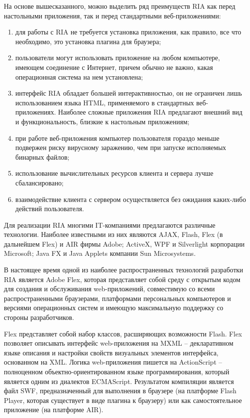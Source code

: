 На основе вышесказанного, можно выделить ряд преимуществ RIA как перед настольными приложения,
так и перед стандартными веб-приложениями:

\begin{enumerate}
\item для работы с RIA не требуется установка приложения, как правило, все что необходимо, это установка плагина
для браузера;
\item пользователи могут использовать приложение на любом компьютере, имеющем соединение с Интернет,
причем обычно не важно, какая операционная система на нем установлена;
\item интерфейс RIA обладает большей интерактивностью, он не ограничен лишь использованием языка
HTML, применяемого в стандартных веб-приложениях. Наиболее сложные приложения RIA предлагают 
внешний вид и функциональность, близкие к настольным приложениям;
\item при работе веб-приложения компьютер пользователя гораздо меньше подвержен риску
вирусному заражению, чем при запуске исполняемых бинарных файлов;
\item использование вычислительных ресурсов клиента и сервера лучше сбалансировано;
\item взаимодействие клиента с сервером осуществляется без ожидания каких-либо действий
пользователя.
\end{enumerate}

Для реализации RIA многими IT-компаниями предлагаются различные технологии. Наиболее известными из 
них являются AJAX, Flash, Flex (в дальнейшем Flex) и AIR фирмы Adobe; ActiveX, WPF и Silverlight
корпорации Microsoft; Java FX и Java Applets компании Sun Microsystems.

В настоящее время одной из наиболее распространенных технологий разработки RIA является Adobe Flex,
которая представляет собой среду с открытым кодом для создания и обслуживания web-приложений,
совместимую со всеми распространенными браузерами, платформами персональных компьютеров и версиями
операционных систем и имеющую максимальную поддержку со стороны разработчиков\cite{modeling2}.

Flex представляет собой набор классов, расширяющих возможности Flash. Flex позволяет описывать
интерфейс web-приложения на MXML – декларативном языке описания и настройки свойств визуальных 
элементов интерфейса, основанном на XML. Логика web-приложения пишется на ActionScript – полноценном
объектно-ориентированном языке программирования, который является одним из диалектов ECMAScript.
Результатом компиляции является файл SWF, предназначенный для выполнения в браузере (на платформе
Flash Player, которая существует в виде плагина к браузеру) или как самостоятельное приложение (на
платформе AIR).

